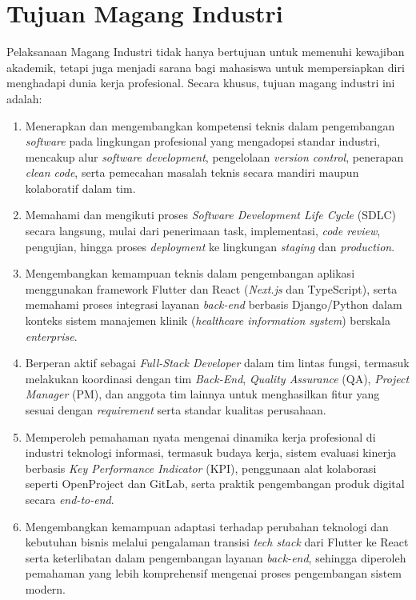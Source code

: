 \newpage
\section{Tujuan Magang Industri}

Pelaksanaan Magang Industri tidak hanya bertujuan untuk memenuhi kewajiban
akademik, tetapi juga menjadi sarana bagi mahasiswa untuk mempersiapkan diri
menghadapi dunia kerja profesional. Secara khusus, tujuan magang industri ini
adalah:

\begin{enumerate}[noitemsep]
      \item Menerapkan dan mengembangkan kompetensi teknis dalam pengembangan
            \textit{software} pada lingkungan profesional yang mengadopsi standar industri,
            mencakup alur \textit{software development}, pengelolaan \textit{version
                  control}, penerapan \textit{clean code}, serta pemecahan masalah teknis secara
            mandiri maupun kolaboratif dalam tim.

      \item Memahami dan mengikuti proses \textit{Software Development Life Cycle} (SDLC)
            secara langsung, mulai dari penerimaan task, implementasi, \textit{code
                  review}, pengujian, hingga proses \textit{deployment} ke lingkungan
            \textit{staging} dan \textit{production}.

      \item Mengembangkan kemampuan teknis dalam pengembangan aplikasi menggunakan
            framework Flutter dan React (\textit{Next.js} dan TypeScript), serta memahami
            proses integrasi layanan \textit{back-end} berbasis Django/Python dalam konteks
            sistem manajemen klinik (\textit{healthcare information system}) berskala
            \textit{enterprise}.

      \item Berperan aktif sebagai \textit{Full-Stack Developer} dalam tim lintas fungsi,
            termasuk melakukan koordinasi dengan tim \textit{Back-End}, \textit{Quality
                  Assurance} (QA), \textit{Project Manager} (PM), dan anggota tim lainnya untuk
            menghasilkan fitur yang sesuai dengan \textit{requirement} serta standar
            kualitas perusahaan.

      \item Memperoleh pemahaman nyata mengenai dinamika kerja profesional di industri
            teknologi informasi, termasuk budaya kerja, sistem evaluasi kinerja berbasis
            \textit{Key Performance Indicator} (KPI), penggunaan alat kolaborasi seperti
            OpenProject dan GitLab, serta praktik pengembangan produk digital secara
            \textit{end-to-end}.

      \item Mengembangkan kemampuan adaptasi terhadap perubahan teknologi dan kebutuhan
            bisnis melalui pengalaman transisi \textit{tech stack} dari Flutter ke React
            serta keterlibatan dalam pengembangan layanan \textit{back-end}, sehingga
            diperoleh pemahaman yang lebih komprehensif mengenai proses pengembangan sistem
            modern.
\end{enumerate}